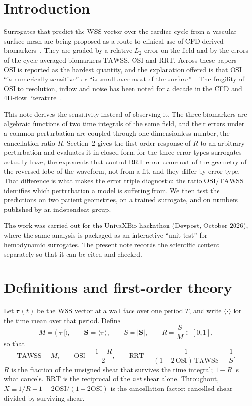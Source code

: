 \documentclass[11pt,a4paper]{article}
\newcommand{\TAWSS}{\mathrm{TAWSS}}
\newcommand{\OSI}{\mathrm{OSI}}
\newcommand{\RRT}{\mathrm{RRT}}
\begin{document}
\section{Introduction}

Surrogates that predict the WSS vector over the cardiac cycle from a vascular
surface mesh are being proposed as a route to clinical use of CFD-derived
biomarkers~\cite{npj2026,jekenrico2025,rhsia2026,rygiel2025}. They are
graded by a relative $L_2$ error on the field and by the errors of the
cycle-averaged biomarkers $\TAWSS$, $\OSI$ and $\RRT$. Across these papers
$\OSI$ is reported as the hardest quantity, and the explanation offered is
that $\OSI$ ``is numerically sensitive'' or ``is small over most of the
surface''~\cite{rhsia2026,aaa2025}. The fragility of $\OSI$ to resolution,
inflow and noise has been noted for a decade in the CFD and 4D-flow
literature~\cite{sarrami2016,bergersen2017,mri2016}.

This note derives the sensitivity instead of observing it. The three
biomarkers are algebraic functions of two time integrals of the same field,
and their errors under a common perturbation are coupled through one
dimensionless number, the cancellation ratio $R$. Section~\ref{sec:theory}
gives the first-order response of $R$ to an arbitrary perturbation and
evaluates it in closed form for the three error types surrogates actually
have; the exponents that control $\RRT$ error come out of the geometry of the
reversed lobe of the waveform, not from a fit, and they differ by error type.
That difference is what makes the error triple diagnostic: the ratio
$\OSI/\TAWSS$ identifies which perturbation a model is suffering from. We
then test the predictions on two patient geometries, on a trained surrogate,
and on numbers published by an independent group.

The work was carried out for the UnivaXBio hackathon (Devpost, October 2026),
where the same analysis is packaged as an interactive ``unit test'' for
hemodynamic surrogates. The present note records the scientific content
separately so that it can be cited and checked.

\section{Definitions and first-order theory}
\label{sec:theory}

Let $\boldsymbol\tau(t)$ be the WSS vector at a wall face over one period
$T$, and write $\langle\cdot\rangle$ for the time mean over that period.
Define
\begin{equation}
M=\langle|\boldsymbol\tau|\rangle,\qquad
\mathbf S=\langle\boldsymbol\tau\rangle,\qquad
S=|\mathbf S|,\qquad
R=\frac{S}{M}\in[0,1],
\end{equation}
so that
\begin{equation}
\TAWSS=M,\qquad
\OSI=\frac{1-R}{2},\qquad
\RRT=\frac{1}{(1-2\,\OSI)\,\TAWSS}=\frac{1}{S}.
\end{equation}
$R$ is the fraction of the unsigned shear that survives the time integral;
$1-R$ is what cancels. $\RRT$ is the reciprocal of the \emph{net} shear
alone. Throughout, $X\equiv1/R-1=2\OSI/(1-2\OSI)$ is the cancellation
factor: cancelled shear divided by surviving shear.
\end{document}
